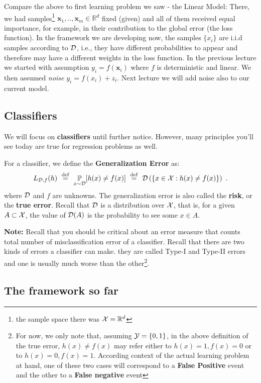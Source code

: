\documentclass[11pt]{article}
\begin{document}
{Compare the above to first learning problem we saw - the Linear Model: There, we had samples\footnote{the sample space there was $\mathcal{X}=\mathbb{R}^d$} $\mathbf{x}_1,..,\mathbf{x}_m\in\mathbb{R}^d$  fixed (given) and all of them received equal importance, for example, in their contribution to the global error (the loss function). In the framework we are developing now, the samples $\{x_i\}$ are  i.i.d samples according to $\mathcal{D}$, i.e., they have different probabilities to appear and therefore may have a different weights in the loss function.
In the previous lecture we started with assumption $y_i=f(\mathbf{x}_i)$ where $f$ is deterministic and linear. We then assumed \textit{noise} $y_i = f(x_i)+z_i$. Next lecture we will add noise also to our current model.

\subsection{Classifiers}

We will focus on \textbf{classifiers} until further notice. However, many principles you'll see today are true for regression problems as well.

For a classifier, we define the \textbf{Generalization Error} as:
\[
L_{\mathcal{D},f}(h) ~\stackrel{\mathrm{def}}{=}~ \operatorname*{\mathbb{P}}_{x \sim \mathcal{D}}[h(x) \neq f(x)] ~\stackrel{\mathrm{def}}{=}~ \mathcal{D}\left( \{ x \in \mathcal{X} : h(x)
  \neq f(x) \}\right) ~.
\]
where $\mathcal{D}$ and $f$ are unknowns. The generalization error is also called the \textbf{risk}, or the \textbf{true error}. Recall that $\mathcal{D}$ is a distribution over $\mathcal{X}$, that is, for a given $A \subset \mathcal{X}$, the value of $\mathcal{D}(A)$ is the probability to see some $x \in A$.

{\bf Note:} Recall that you should be critical about an error measure that counts
total number of misclassification error of a classifier. Recall that  there are two kinds of errors a classifier can make. they are called Type-I and Type-II errors and one is usually much worse than the other\footnote{For now, we only note that, assuming $\mathcal{Y} =\{0,1\}$, in the above definition of the true error, $h(x) \neq f(x)$ may refer either to  $h(x)=1, f(x)=0$ or to $h(x)=0, f(x)=1$. According context of the actual learning problem at hand, one of these two cases  will correspond to a \textbf{False Positive} event and the other to a \textbf{False negative} event}.

\subsection{The framework so far} \label{sec:frame}

}
\end{document}
